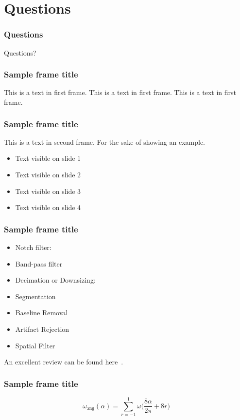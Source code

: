 \documentclass[aspectratio=169]{beamer}
\begin{document}
    
        \section{Questions}
    \begin{frame} %
        \frametitle{Questions}
        \begin{center}
        \LARGE Questions?
        \end{center}
    \end{frame}

\begin{frame}
\frametitle{Sample frame title}
This is a text in first frame. This is a text in first frame. This is a text in first frame.
\end{frame}


\begin{frame}
\frametitle{Sample frame title}
This is a text in second frame. 
For the sake of showing an example.
 
\begin{itemize}
 \item<1-> Text visible on slide 1
 \item<2-> Text visible on slide 2
 \item<3> Text visible on slide 3
 \item<4-> Text visible on slide 4
\end{itemize}
 
\end{frame}


\begin{frame}
\frametitle{Sample frame title}
\begin{itemize}
\item Notch filter:
\item Band-pass filter
\item Decimation or Downsizing:
\item Segmentation
\item Baseline Removal
\item Artifact Rejection
\item Spatial Filter
\end{itemize}
An excellent review can be found here~\cite{Simons2016}.
\end{frame}



\begin{frame}
\frametitle{Sample frame title}
\begin{equation}
 \omega_\mathrm{ang}(\alpha) = \sum_{r=-1}^{1} \omega \bigg ( \frac{8\alpha}{2\pi} + 8r \bigg )
\label{eq:wang}
\end{equation}
\end{frame}
\end{document}
